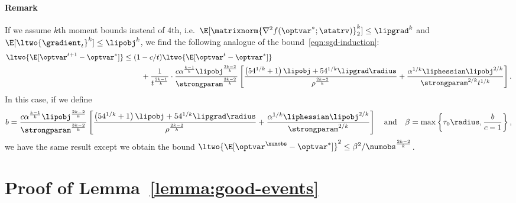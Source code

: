 \documentclass[11pt,twoside]{article}
\theoremstyle{definition}
\begin{document}
\paragraph{Remark}
If we assume $k$th moment bounds instead of $4$th,
i.e.\ $\E[\matrixnorm{\nabla^2 f(\optvar^*; \statrv)}_2^k] \le \lipgrad^k$ and
$\E[\ltwo{\gradient_t}^k] \le \lipobj^k$, we find the following analogue of
the bound~\eqref{eqn:sgd-induction}:
\begin{align*}
  \ltwo{\E[\optvar^{t + 1} - \optvar^*]}
  & \le (1 - c/t) \ltwo{\E[\optvar^t - \optvar^*]} \\
  & \qquad ~ + \frac{1}{t^{\frac{2k - 1}{k}}} \cdot
  \frac{c \alpha^{\frac{k - 1}{k}} \lipobj^{\frac{2k - 2}{k}}}{
    \strongparam^{\frac{3k - 2}{k}}}
  \left[\frac{\left(54^{1/k} + 1\right) \lipobj + 54^{1/k} \lipgrad \radius}{
      \rho^{\frac{2k - 2}{k}}}
    + \frac{\alpha^{1/k} \liphessian \lipobj^{2/k}}{\strongparam^{2/k} t^{1/k}}
    \right].
\end{align*}
In this case, if we define
\begin{equation*}
  b = \frac{c \alpha^{\frac{k - 1}{k}} \lipobj^{\frac{2k - 2}{k}}}{
    \strongparam^{\frac{3k - 2}{k}}}
  \left[\frac{\left(54^{1/k} + 1\right) \lipobj + 54^{1/k} \lipgrad \radius}{
      \rho^{\frac{2k - 2}{k}}}
    + \frac{\alpha^{1/k} \liphessian \lipobj^{2/k}}{\strongparam^{2/k}}
    \right]
  ~~~ \mbox{and} ~~~
  \beta = \max\left\{\tau_0 \radius, \frac{b}{c - 1}\right\},
\end{equation*}
we have the same result except we obtain the bound
$\ltwo{\E[\optvar^\numobs - \optvar^*]}^2 \le \beta^2 /
\numobs^{\frac{2k - 2}{k}}$.





\section{Proof of Lemma~\ref{lemma:good-events}}
\label{appendix:proof-of-lemma-good-events}
\end{document}
